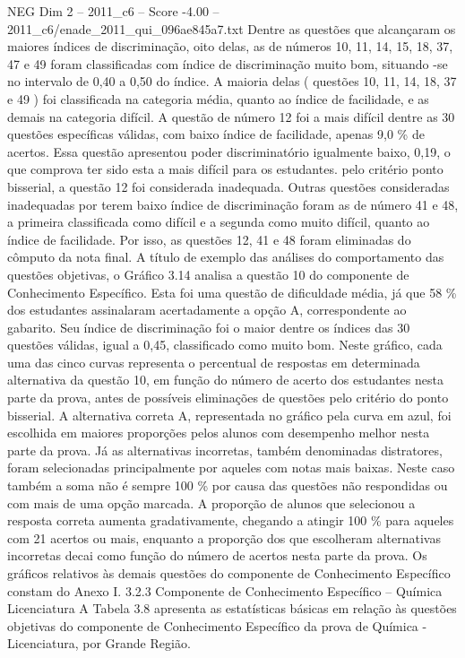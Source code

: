 \begin{textsample}{NEG Dim 2 – 2011\_c6 – Score -4.00 – 2011\_c6/enade\_2011\_qui\_096ae845a7.txt}
Dentre as questões que alcançaram os maiores índices de discriminação, oito delas, as de números 10, 11, 14, 15, 18, 37, 47 e 49 foram classificadas com índice de discriminação muito bom, situando -se no intervalo de 0,40 a 0,50 do índice.
A maioria delas ( questões 10, 11, 14, 18, 37 e 49 ) foi classificada na categoria média, quanto ao índice de facilidade, e as demais na categoria difícil.
A questão de número 12 foi a mais difícil dentre as 30 questões específicas válidas, com baixo índice de facilidade, apenas 9,0 \% de acertos.
Essa questão apresentou poder discriminatório igualmente baixo, 0,19, o que comprova ter sido esta a mais difícil para os estudantes. pelo critério ponto bisserial, a questão 12 foi considerada inadequada.
Outras questões consideradas inadequadas por terem baixo índice de discriminação foram as de número 41 e 48, a primeira classificada como difícil e a segunda como muito difícil, quanto ao índice de facilidade.
Por isso, as questões 12, 41 e 48 foram eliminadas do cômputo da nota final.
A título de exemplo das análises do comportamento das questões objetivas, o Gráfico 3.14 analisa a questão 10 do componente de Conhecimento Específico.
Esta foi uma questão de dificuldade média, já que 58 \% dos estudantes assinalaram acertadamente a opção A, correspondente ao gabarito.
Seu índice de discriminação foi o maior dentre os índices das 30 questões válidas, igual a 0,45, classificado como muito bom.
Neste gráfico, cada uma das cinco curvas representa o percentual de respostas em determinada alternativa da questão 10, em função do número de acerto dos estudantes nesta parte da prova, antes de possíveis eliminações de questões pelo critério do ponto bisserial.
A alternativa correta A, representada no gráfico pela curva em azul, foi escolhida em maiores proporções pelos alunos com desempenho melhor nesta parte da prova.
Já as alternativas incorretas, também denominadas distratores, foram selecionadas principalmente por aqueles com notas mais baixas.
Neste caso também a soma não é sempre 100 \% por causa das questões não respondidas ou com mais de uma opção marcada.
A proporção de alunos que selecionou a resposta correta aumenta gradativamente, chegando a atingir 100 \% para aqueles com 21 acertos ou mais, enquanto a proporção dos que escolheram alternativas incorretas decai como função do número de acertos nesta parte da prova.
Os gráficos relativos às demais questões do componente de Conhecimento Específico constam do Anexo I. 3.2.3 Componente de Conhecimento Específico – Química Licenciatura A Tabela 3.8 apresenta as estatísticas básicas em relação às questões objetivas do componente de Conhecimento Específico da prova de Química - Licenciatura, por Grande Região.

\end{textsample}
